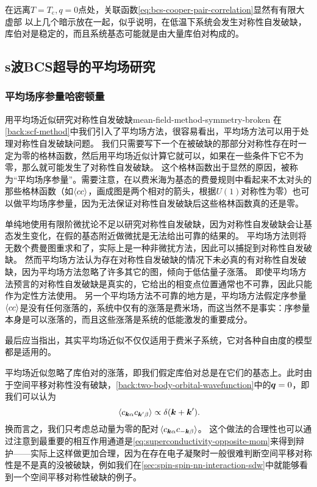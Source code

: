 在远离$T = T_\text{c}, q = 0$点处，关联函数\eqref{eq:bcs-cooper-pair-correlation}显然有有限大虚部
以上几个暗示放在一起，似乎说明，在低温下系统会发生对称性自发破缺，库伯对是稳定的，而且系统基态可能就是由大量库伯对构成的。

\subsection{s波BCS超导的平均场研究}

\subsubsection{平均场序参量哈密顿量}

\begin{back}{用平均场近似研究对称性自发破缺}{mean-field-method-symmetry-broken}
    在\autoref{back:scf-method}中我们引入了平均场方法，很容易看出，平均场方法可以用于处理对称性自发破缺问题。
    我们只需要写下一个在被破缺的那部分对称性存在时一定为零的格林函数，然后用平均场近似计算它就可以，如果在一些条件下它不为零，那么就可能发生了对称性自发破缺。
    这个格林函数出于显然的原因，被称为“平均场序参量”。需要注意，在以费米海为基态的费曼规则中看起来不太对头的那些格林函数（如$\expval{c c}$，画成图是两个相对的箭头，根据$U(1)$对称性为零）也可以做平均场序参量，因为无法保证对称性自发破缺后这些格林函数真的还是零。

    单纯地使用有限阶微扰论不足以研究对称性自发破缺，因为对称性自发破缺会让基态发生变化，在假的基态附近做微扰是无法给出可靠的结果的。
    平均场方法则将无数个费曼图重求和了，实际上是一种非微扰方法，因此可以捕捉到对称性自发破缺。
    然而平均场方法认为存在对称性自发破缺的情况下未必真的有对称性自发破缺，因为平均场方法忽略了许多其它的图，倾向于低估量子涨落。
    即使平均场方法预言的对称性自发破缺是真实的，它给出的相变点位置通常也不可靠，因此只能作为定性方法使用。
    另一个平均场方法不可靠的地方是，平均场方法假定序参量$\expval{cc}$是没有任何涨落的，系统中仅有的涨落是费米场，而这当然不是事实：序参量本身是可以涨落的，而且这些涨落是系统的低能激发的重要成分。

    最后应当指出，其实平均场近似不仅仅适用于费米子系统，它对各种自由度的模型都是适用的。
\end{back}

平均场近似忽略了库伯对的涨落，即我们假定库伯对总是在它们的基态上。此时由于空间平移对称性没有破缺，\autoref{back:two-body-orbital-wavefunction}中的$\vb*{q} = 0$，即我们可以认为
\[
    \expval*{{c}_{\vb*{k}\alpha} {c}_{\vb*{k}' \beta}} \propto \delta(\vb*{k} + \vb*{k}').
\]
换而言之，我们只考虑总动量为零的配对$\expval*{{c}_{\vb*{k} \alpha} {c}_{- \vb*{k} \beta}}$。
这个做法的合理性也可以通过注意到最重要的相互作用通道是\eqref{eq:superconductivity-opposite-mom}来得到辩护——实际上这样做更加合理，因为在存在电子凝聚时一般很难判断空间平移对称性是不是真的没被破缺，例如我们在\autoref{sec:spin-spin-nn-interaction-sdw}中就能够看到一个空间平移对称性破缺的例子。

